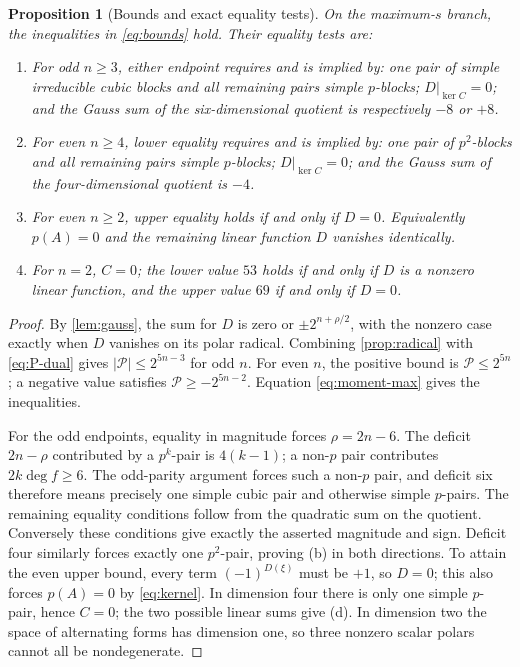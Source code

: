 \documentclass[11pt,a4paper]{article}
\newtheorem{proposition}[theorem]{Proposition}
\theoremstyle{definition}
\theoremstyle{remark}
\numberwithin{equation}{section}
\newcommand{\Pm}{\mathcal P}
\begin{document}
\begin{proposition}[Bounds and exact equality tests]\label{prop:equality}
On the maximum-\(s\) branch, the inequalities in \eqref{eq:bounds}
hold. Their equality tests are:
\begin{enumerate}[label=(\alph*)]
\item For odd \(n\geq3\), either endpoint requires and is implied by:
one pair of simple irreducible cubic blocks and all remaining pairs
simple \(p\)-blocks; \(D|_{\ker C}=0\); and the Gauss sum of the
six-dimensional quotient is respectively \(-8\) or \(+8\).
\item For even \(n\geq4\), lower equality requires and is implied by:
one pair of \(p^2\)-blocks and all remaining pairs simple \(p\)-blocks;
\(D|_{\ker C}=0\); and the Gauss sum of the four-dimensional quotient
is \(-4\).
\item For even \(n\geq2\), upper equality holds if and only if \(D=0\).
Equivalently \(p(A)=0\) and the remaining linear function \(D\)
vanishes identically.
\item For \(n=2\), \(C=0\); the lower value \(53\) holds if and only if
\(D\) is a nonzero linear function, and the upper value \(69\) if and
only if \(D=0\).
\end{enumerate}
\end{proposition}
\begin{proof}
By \cref{lem:gauss}, the sum for \(D\) is zero or
\(\pm2^{n+\rho/2}\), with the nonzero case exactly when \(D\) vanishes
on its polar radical. Combining \cref{prop:radical} with
\eqref{eq:P-dual} gives \(|\Pm|\leq2^{5n-3}\) for odd \(n\).
For even \(n\), the positive bound is \(\Pm\leq2^{5n}\);
a negative value satisfies \(\Pm\geq-2^{5n-2}\).
Equation \eqref{eq:moment-max} gives the inequalities.

For the odd endpoints, equality in magnitude forces \(\rho=2n-6\).
The deficit \(2n-\rho\) contributed by a \(p^k\)-pair is \(4(k-1)\);
a non-\(p\) pair contributes \(2k\deg f\geq6\).
The odd-parity argument forces such a non-\(p\) pair, and deficit six
therefore means precisely one simple cubic pair and otherwise simple
\(p\)-pairs. The remaining equality conditions follow from the
quadratic sum on the quotient. Conversely these conditions give exactly
the asserted magnitude and sign.
Deficit four similarly forces exactly one \(p^2\)-pair, proving (b)
in both directions. To attain the even upper bound, every term
\((-1)^{D(\xi)}\) must be \(+1\), so \(D=0\); this also forces
\(p(A)=0\) by \eqref{eq:kernel}.
In dimension four there is only one simple \(p\)-pair, hence \(C=0\);
the two possible linear sums give (d).
In dimension two the space of alternating forms has dimension one,
so three nonzero scalar polars cannot all be nondegenerate.
\end{proof}
\end{document}
